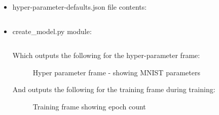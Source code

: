 \documentclass[./project-report/src/latex/project-report.tex]{subfiles}
\begin{document}
\begin{itemize}
    \item hyper-parameter-defaults.json file contents:
        \inputminted{json}{./school_project/frames/hyper-parameter-defaults.json}
    \item create\_model.py module:
        \label{sec:create_model-module}
        \inputminted{python}{./school_project/frames/create_model.py}
        
        Which outputs the following for the hyper-parameter frame:

        \pagebreak
        
        \begin{figure}[h!]
        \centering
		\caption{Hyper parameter frame - showing MNIST parameters}
        \label{fig:hyper-parameter-frame}
        \end{figure}

        And outputs the following for the training frame during training:

        \begin{figure}[h!]
        \centering
        \caption{Training frame showing epoch count}
        \label{fig:training-frame-1-impl}
        \end{figure}


\end{itemize}
\end{document}
